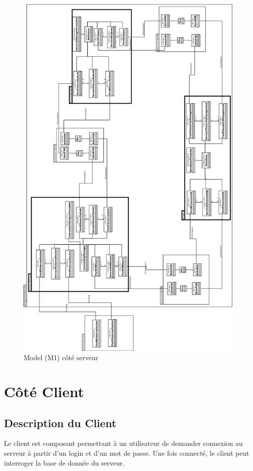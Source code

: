 \begin{figure}[htb]
\pagestyle{empty}
  \centering
  \includegraphics[scale=0.20]{img/M1}
  \caption{Model (M1) côté serveur}
  \label{fig:M1}
\end{figure}
\clearpage
\pagestyle{fancy}
\section{Côté Client}

\subsection{Description du Client}
Le client est composant permettant  à un utilisateur de demander connexion au serveur à partir d'un login et d'un mot de passe. Une fois connecté, le client peut interroger la base de donnée du serveur.
 
